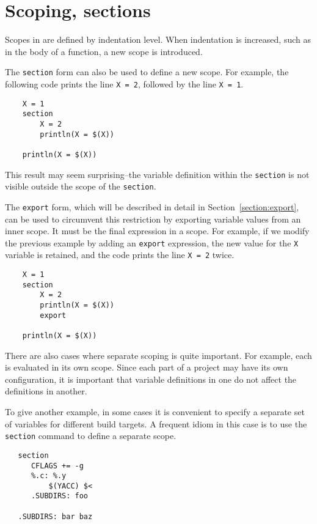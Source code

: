 \section{Scoping, sections}
\label{section:section}

Scopes in  are defined by indentation level.  When indentation is
increased, such as in the body of a function, a new scope is introduced.

The \verb+section+ form can also be used to define a new scope.  For example, the following code
prints the line \verb+X = 2+, followed by the line \verb+X = 1+.

\begin{verbatim}
    X = 1
    section
        X = 2
        println(X = $(X))

    println(X = $(X))
\end{verbatim}

This result may seem surprising--the variable definition within the
\verb+section+ is not visible outside the scope of the \verb+section+.

The \verb+export+ form, which will be described in detail in
Section~\ref{section:export}, can be used to circumvent this restriction by
exporting variable values from an inner scope.  It must be the final
expression in a scope.  For example, if we modify the previous example
by adding an \verb+export+ expression, the new value for the \verb+X+
variable is retained, and the code prints the line \verb+X = 2+ twice.

\begin{verbatim}
    X = 1
    section
        X = 2
        println(X = $(X))
        export

    println(X = $(X))
\end{verbatim}

There are also cases where separate scoping is quite important.  For example,
each  is evaluated in its own scope.  Since each part of a project
may have its own configuration, it is important that variable definitions in one
 do not affect the definitions in another.

To give another example, in some cases it is convenient to specify a
separate set of variables for different build targets.  A frequent
idiom in this case is to use the \verb+section+ command to define a
separate scope.

\begin{verbatim}
   section
      CFLAGS += -g
      %.c: %.y
          $(YACC) $<
      .SUBDIRS: foo

   .SUBDIRS: bar baz
\end{verbatim}

